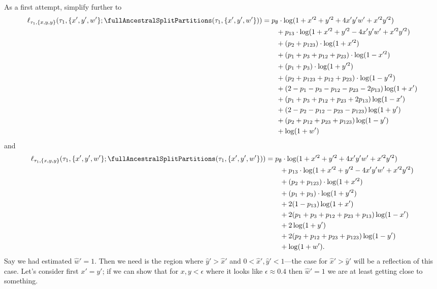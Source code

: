 As a first attempt, simplify further to
\begin{align*}
    \ell_{\tau_1,\{x,y,y\}}(\tau_1, \{x',y',w'\}; \fullAncestralSplitPartitions(\tau_1,\{x',y',w'\}))
    &=        p_{\emptyset}  \cdot\log(1+x'^2+y'^2+4x'y'w'+x'^2y'^2) \\
    &\qquad + p_{13}         \cdot\log(1+x'^2+y'^2-4x'y'w'+x'^2y'^2) \\
    &\qquad + (p_{2} + p_{123})          \cdot\log(1+x'^2) \\
    &\qquad + (p_{1} + p_{3} + p_{12} + p_{23})          \cdot\log(1-x'^2) \\
    &\qquad + (p_{1} + p_{3})          \cdot\log(1+y'^2) \\
    &\qquad + (p_{2} + p_{123} + p_{12} + p_{23})          \cdot\log(1-y'^2) \\
    &\qquad + (2-p_{1}-p_{3}-p_{12}-p_{23}-2p_{13})\log(1+x') \\
    &\qquad + (p_{1}+p_{3}+p_{12}+p_{23}+2p_{13})\log(1-x') \\
    &\qquad + (2-p_{2}-p_{12}-p_{23}-p_{123})\log(1+y') \\
    &\qquad + (p_{2}+p_{12}+p_{23}+p_{123})\log(1-y') \\
    &\qquad + \log(1+w')
\end{align*}
and
\begin{align*}
    \ell_{\tau_1,\{x,y,y\}}(\tau_1, \{x',y',w'\}; \fullAncestralSplitPartitions(\tau_1,\{x',y',w'\}))
    &=        p_{\emptyset}  \cdot\log(1+x'^2+y'^2+4x'y'w'+x'^2y'^2) \\
    &\qquad + p_{13}         \cdot\log(1+x'^2+y'^2-4x'y'w'+x'^2y'^2) \\
    &\qquad + (p_{2} + p_{123})          \cdot\log(1+x'^2) \\
    &\qquad + (p_{1} + p_{3})          \cdot\log(1+y'^2) \\
    &\qquad + 2(1-p_{13})\log(1+x') \\
    &\qquad + 2(p_{1}+p_{3}+p_{12}+p_{23}+p_{13})\log(1-x') \\
    &\qquad + 2\log(1+y') \\
    &\qquad + 2(p_{2}+p_{12}+p_{23}+p_{123})\log(1-y') \\
    &\qquad + \log(1+w').
\end{align*}
Say we had estimated $\hat{w}'=1$.
Then we need is the region where $\hat{y}'>\hat{x}'$ and $0<\hat{x}',\hat{y}'<1$---the case for $\hat{x}'>\hat{y}'$ will be a reflection of this case.
Let's consider first $x'=y'$; if we can show that for $x,y<\epsilon$ where it looks like $\epsilon\approx 0.4$ then $\hat{w}'=1$ we are at least getting close to something.
